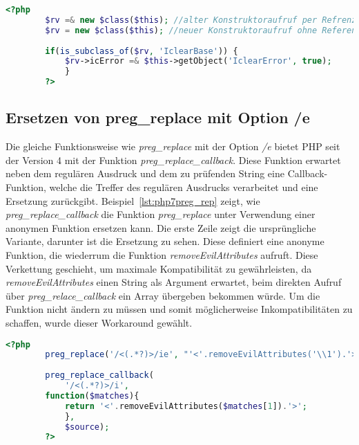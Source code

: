     \begin{lstlisting}[language=php, caption={Beispiel der Ersetzung von Konstruktoraufrufen per Referenz}, label={lst:php7newReference}]
        <?php
        $rv =& new $class($this); //alter Konstruktoraufruf per Refrenz
        $rv = new $class($this); //neuer Konstruktoraufruf ohne Referenz
        
        if(is_subclass_of($rv, 'IclearBase')) {
            $rv->icError =& $this->getObject('IclearError', true);
            }
        ?>
    \end{lstlisting}
    
    \subsection{Ersetzen von preg\_replace mit Option /e}\label{preg}
    Die gleiche Funktionsweise wie \textit{preg\_replace} mit der Option \textit{/e} bietet \ac{PHP} seit der Version 4 mit der 
    Funktion \textit{preg\_replace\_callback}. Diese Funktion erwartet neben dem regulären Ausdruck und dem zu prüfenden 
    String eine Callback-Funktion, welche die Treffer des regulären Ausdrucks verarbeitet und eine Ersetzung zurückgibt.
    Beispiel~\ref{lst:php7preg_rep} zeigt, wie \textit{preg\_replace\_callback} die Funktion \textit{preg\_replace} unter 
    Verwendung einer anonymen Funktion ersetzen kann. Die erste Zeile zeigt die ursprüngliche Variante, darunter ist die 
    Ersetzung zu sehen. Diese definiert eine anonyme Funktion, die wiederrum die Funktion \textit{removeEvilAttributes} aufruft. 
    Diese Verkettung geschieht, um maximale Kompatibilität zu gewährleisten, da \textit{removeEvilAttributes} einen String 
    als Argument erwartet, beim direkten Aufruf über \textit{preg\_relace\_callback} ein Array übergeben bekommen würde. Um 
    die Funktion nicht ändern zu müssen und somit möglicherweise Inkompatibilitäten zu schaffen, wurde dieser Workaround 
    gewählt.
        
    \begin{lstlisting}[language=php, caption={Beispiel der Nutzung von preg\_replace\_callback}, label={lst:php7preg_rep}]
        <?php
        preg_replace('/<(.*?)>/ie', "'<'.removeEvilAttributes('\\1').'>'", $source);
        
        preg_replace_callback(
            '/<(.*?)>/i', 
        function($matches){
            return '<'.removeEvilAttributes($matches[1]).'>';
            },
            $source);
        ?>
    \end{lstlisting}
            
